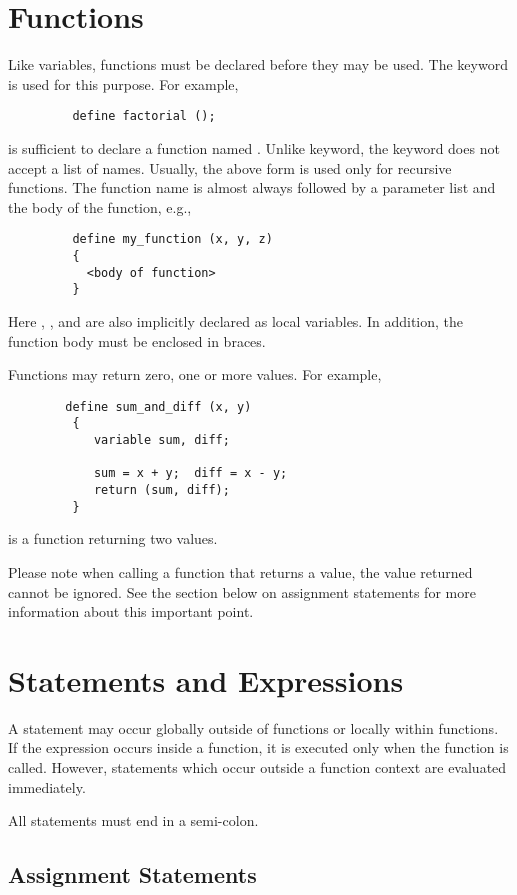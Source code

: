 \section{Functions}

   Like variables, functions must be declared before they may be used. The
    keyword is used for this purpose.  For example,   
\begin{verbatim}
         define factorial ();
\end{verbatim}
   is sufficient to declare a function named .  Unlike
    keyword, the  keyword does not accept a list of names.
   Usually, the above form is used only for recursive functions.  The
   function name is almost always followed by a parameter list and the
   body of the function, e.g.,
\begin{verbatim}
         define my_function (x, y, z)
         {
           <body of function>
         }
\end{verbatim}
   Here , , and  are also implicitly declared as local variables.
   In addition, the function body must be enclosed in braces.
   
   Functions may return zero, one or more values.  For example,
\begin{verbatim}
        define sum_and_diff (x, y)
         {
            variable sum, diff;

            sum = x + y;  diff = x - y;
            return (sum, diff);
         }
\end{verbatim}
   is a function returning two values.
   
   Please note when calling a function that returns a value, the value
   returned cannot be ignored.   See the section below on assignment
   statements for more information about this important point.


\section{Statements and Expressions}

   A statement may occur globally outside of functions or locally within
   functions.   If the expression occurs inside a function, it is executed
   only when the function is called.  However, statements which occur
   outside a function context are evaluated immediately.
   
   All statements must end in a semi-colon.
   
   
\subsection{Assignment Statements}

